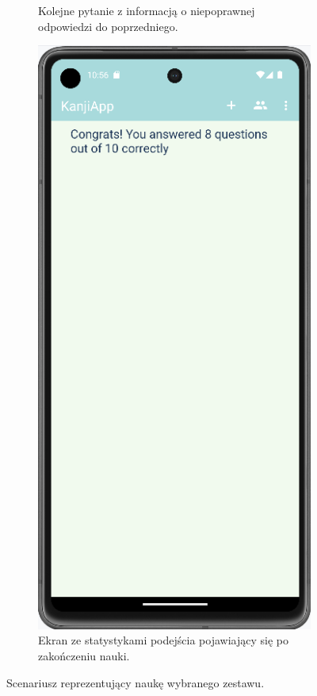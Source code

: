 \documentclass[a4paper,twoside,12pt]{book}
\begin{document}
\begin{figure}
\begin{subfigure}{0.3\textwidth}
   \caption{Kolejne pytanie z informacją o niepoprawnej odpowiedzi do poprzedniego.}
   \label{fig:incorrect}
\end{subfigure}
\hfill
\begin{subfigure}{0.3\textwidth}
   \includegraphics[width=\textwidth]{learn/stats}
   \caption{Ekran ze statystykami podejścia pojawiający się po zakończeniu nauki.}
   \label{fig:stats}
\end{subfigure}
 

\caption{Scenariusz reprezentujący naukę wybranego zestawu.}
\label{fig:study}
\end{figure}
\end{document}
